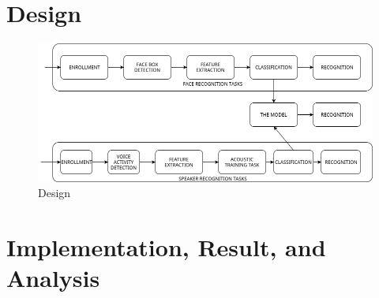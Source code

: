 \chapter{Design}

\begin{figure}[H]%
\centering
\includegraphics[width=5.5in]{./design.png}
\caption{Design}
\label{fig:High_Level_Design}
\end{figure}


\chapter{Implementation, Result, and Analysis}



